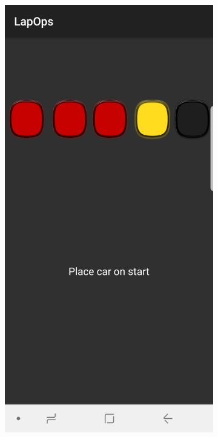 \begin{figure}[H]
	\begin{subfigure}[c]{0.4\textwidth}
		\includegraphics[width=\textwidth]{Pictures/App/PreNearFiled.jpg}
		

\end{subfigure}
\end{figure}
